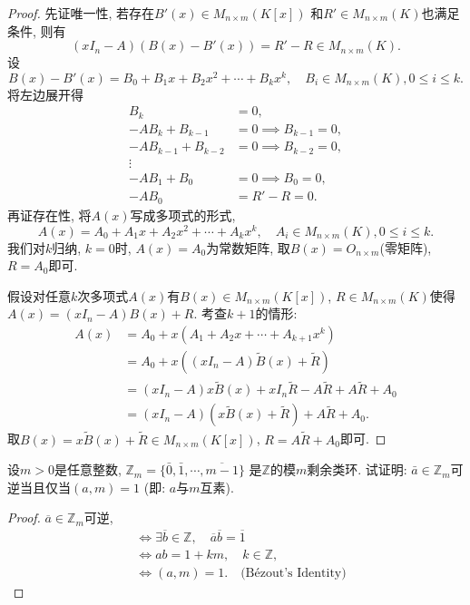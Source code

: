 \begin{proof}
    先证唯一性, 若存在$B'(x) \in M_{n \times m}(K[x])$
和$R' \in M_{n \times m}(K)$也满足条件, 则有
    \[
        (xI_n - A)(B(x) - B'(x)) = R' - R \in M_{n \times m}(K).
    \]
    设
\[
    B(x) - B'(x) = B_0 + B_1x + B_2x^2 + \cdots + B_kx^k, \quad B_i \in M_{n \times m}(K), 0 \leqslant i \leqslant k.
\]
    将左边展开得
\[
\begin{aligned}
    B_k &= 0,\\
    -AB_k + B_{k - 1} &= 0 \implies B_{k - 1} = 0,\\
    -AB_{k - 1} + B_{k - 2} &= 0 \implies B_{k - 2} = 0,\\
    \vdots\\
    -AB_1 + B_0 &= 0 \implies B_0 = 0,\\
    -AB_0 &= R' - R = 0.
\end{aligned}
\]
    再证存在性, 将$A(x)$写成多项式的形式,
\[
    A(x) = A_0 + A_1x + A_2x^2 + \cdots + A_kx^k, \quad A_i \in M_{n \times m}(K), 0 \leqslant i \leqslant k.
\]
我们对$k$归纳, $k = 0$时, $A(x) = A_0$为常数矩阵, 取$B(x) = O_{n \times m}$(零矩阵), 
$R = A_0$即可.

假设对任意$k$次多项式$A(x)$有$B(x) \in M_{n \times m}(K[x])$, $R \in M_{n \times m}(K)$使得
$A(x) = (xI_n - A)B(x) + R$. 考查$k + 1$的情形: 
\[
\begin{aligned}
    A(x) &= A_0 + x(A_1 + A_2x + \cdots + A_{k + 1}x^k)\\
    &= A_0 + x((xI_n - A)\tilde{B}(x) + \tilde{R})\\
    &= (xI_n - A)x\tilde{B}(x) + xI_n\tilde{R} - A\tilde{R} + A\tilde{R}+ A_0\\
    &= (xI_n - A)(x\tilde{B}(x) + \tilde{R}) + A\tilde{R} + A_0.
\end{aligned}
\]
取$B(x) = x\tilde{B}(x) + \tilde{R} \in M_{n \times m}(K[x])$, 
$R = A\tilde{R} + A_0$即可.
\end{proof}

\begin{problem}
    设$m > 0$是任意整数, $\mathbb{Z}_m = \{\bar{0}, \bar{1}, \cdots, \overline{m-1}\}$
是$\mathbb{Z}$的模$m$剩余类环. 试证明: $\bar{a} \in \mathbb{Z}_m$可逆当且仅当$(a, m) = 1$
(即: $a$与$m$互素).
\end{problem}

\begin{proof}
    $\overline{a} \in \mathbb{Z}_m$可逆, 
\[
\begin{aligned}
    &\iff \exists \overline{b} \in \mathbb{Z}, \quad \overline{a}\overline{b} = \overline{1}\\
    &\iff ab = 1 + km, \quad k \in \mathbb{Z},\\
    &\iff (a, m) = 1. \quad \text{(Bézout's Identity)}
\end{aligned}
\]
\end{proof}

